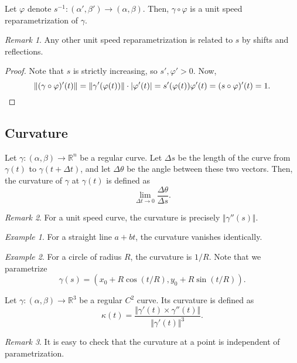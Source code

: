 \documentclass[11pt]{article}
\newcommand{\R}{\mathbb{R}}
\newcommand{\norm}[1]{\Vert #1 \Vert}
\theoremstyle{definition}
\theoremstyle{remark}
\newtheorem*{remark}{Remark}
\newtheorem*{example}{Example}
\numberwithin{equation}{section}
\begin{document}
    \begin{lemma}
        Let $\varphi$ denote $s^{-1}\colon (\alpha', \beta') \to (\alpha, \beta)$.
        Then, $\gamma\circ \varphi$ is a unit speed reparametrization of $\gamma$.

        \begin{remark}
            Any other unit speed reparametrization is related to $s$ by shifts and
            reflections.
        \end{remark}
    \end{lemma}
    \begin{proof}
        Note that $s$ is strictly increasing, so $s', \varphi' > 0$. Now, \[
            \norm{(\gamma\circ \varphi)'(t)} = \norm{\gamma'(\varphi(t))}\cdot
            |\varphi'(t)| = s'(\varphi(t))\varphi'(t) = (s\circ \varphi)'(t) = 1. \qedhere
        \] 
    \end{proof}


    \subsection{Curvature}
    
    \begin{definition}
        Let $\gamma\colon (\alpha, \beta) \to \R^n$ be a regular curve. Let $\Delta
        s$ be the length of the curve from $\gamma(t)$ to $\gamma(t + \Delta t)$, and
        let $\Delta\theta$ be the angle between these two vectors. Then, the
        curvature of $\gamma$ at $\gamma(t)$ is defined as \[
            \lim_{\Delta t \to 0} \frac{\Delta\theta}{\Delta s}.
        \] \begin{remark}
            For a unit speed curve, the curvature is precisely $\norm{\gamma''(s)}$.
        \end{remark}
    \end{definition}
    \begin{example}
        For a straight line $a + bt$, the curvature vanishes identically.
    \end{example}
    \begin{example}
        For a circle of radius $R$, the curvature is $1 / R$. Note that we
        parametrize \[
            \gamma(s) = (x_0 + R\cos(t / R), y_0 + R\sin(t / R)).
        \] 
    \end{example}

    \begin{definition}
        Let $\gamma\colon (\alpha, \beta) \to \R^3$ be a regular $C^2$ curve. Its
        curvature is defined as \[
            \kappa(t) = \frac{\norm{\gamma'(t) \times
            \gamma''(t)}}{\norm{\gamma'(t)}^3}.
        \] 
        \begin{remark}
            It is easy to check that the curvature at a point is independent of
            parametrization.
        \end{remark}
    \end{definition}
\end{document}

